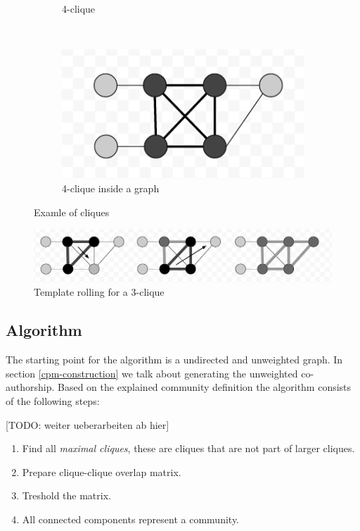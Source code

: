 \documentclass[runningheads,a4paper]{llncs}
\begin{document}
\begin{figure}
\begin{subfigure}[b]{0.3\textwidth}
        \caption{4-clique}
        \label{fig:4clique}
    \end{subfigure}
    ~ %
    \begin{subfigure}[b]{0.3\textwidth}
        \includegraphics[width=\textwidth]{cliqueinside}
        \caption{4-clique inside a graph}
        \label{fig:cliqueInside}
    \end{subfigure}
    \caption{Examle of cliques}\label{fig:cliques}
\end{figure}

\begin{figure}
	\includegraphics[width=\textwidth]{rolling.png}
	\caption{Template rolling for a $3$-clique}
	\label{fig:rolling}
\end{figure}

\subsection{Algorithm}
The starting point for the algorithm is a undirected and unweighted graph. In section \ref{cpm-construction} we talk about generating the  unweighted co-authorship.
Based on the explained community definition the algorithm consists of the following steps:

[TODO: weiter ueberarbeiten ab hier]\\

\begin{enumerate}
\item Find all \emph{maximal cliques}, these are cliques that are not part of larger cliques.
\item Prepare clique-clique overlap matrix.
\item Treshold the matrix.
\item All connected components represent a community.
\end{enumerate}
\end{document}
